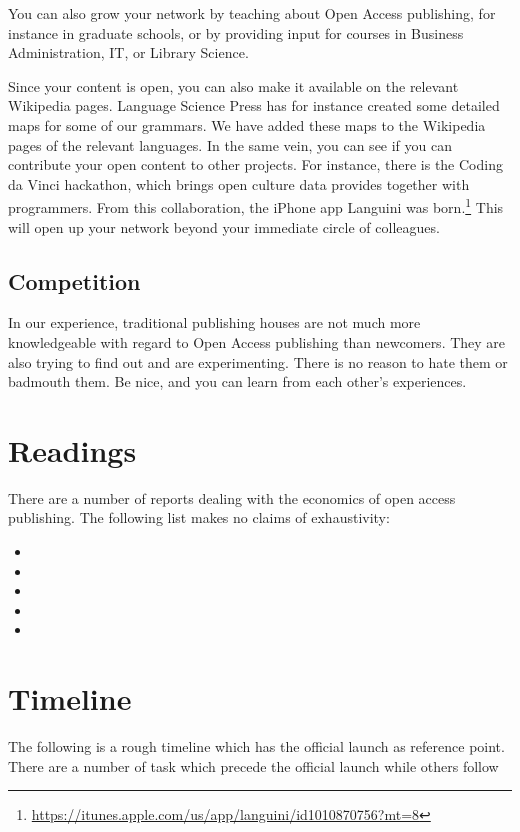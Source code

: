 \documentclass[nonflat,smallfont
]{langsci/langscibook}
\newcommand{\footurl}[1]{\footnote{\url{#1}}}
\begin{document}
You can also grow your network by teaching about Open Access publishing, for instance in graduate schools, or by providing input for courses in Business Administration, IT, or Library Science. 

Since your content is open, you can also make it available on the relevant Wikipedia pages. Language Science Press has for instance created some detailed maps for some of our grammars. We have added these maps to the Wikipedia pages of the relevant languages. In the same vein, you can see if you can contribute your open content to other projects. For instance, there is the Coding da Vinci hackathon, which brings open culture data provides together with programmers. From this collaboration, the iPhone app Languini was born.\footurl{https://itunes.apple.com/us/app/languini/id1010870756?mt=8} This will open up your network beyond your immediate circle of colleagues.  

\section{Competition}\label{sec:competition}
In our experience, traditional publishing houses are not much more knowledgeable with regard to Open Access publishing than newcomers. They are also trying to find out and are experimenting. There is no reason to hate them or badmouth them. Be nice, and you can learn from each other's experiences. 

\chapter{Readings} 
There are a number of reports dealing with the economics of open access publishing. The following list makes no claims of exhaustivity:

\sloppy
\begin{itemize}
\item {}
\item {} 
\item {}
\item {}
\item {}
\end{itemize}
\fussy




\chapter{Timeline}
The following is a rough timeline which has the official launch as reference point. There are a number of task which precede the official launch while others follow
\end{document}
